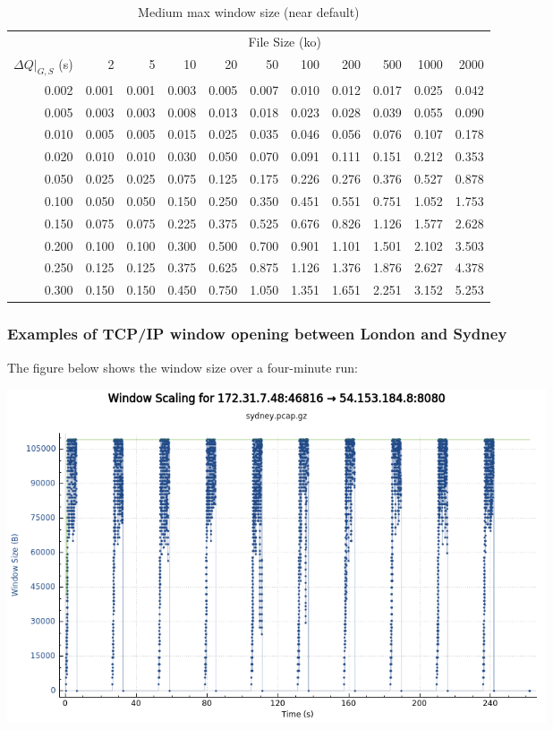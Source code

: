 \documentclass[11pt,a4paper]{article}
\begin{document}
\begin{table}
\begin{longtable}[]{r|rrrrrrrrrr}
\toprule
  \caption{Medium max window size (near default)}
  \label{table:medium-max-window-size}
  \tabularnewline
\midrule
                       & \multicolumn{10}{c}{File Size (ko)}\tabularnewline
$\Delta{}Q|_{G,S}$ (s) & 2 & 5 & 10 & 20 & 50 & 100 & 200 & 500 & 1000 & 2000\tabularnewline
\midrule
\endhead
0.002 & 0.001 & 0.001 & 0.003 & 0.005 & 0.007 & 0.010 & 0.012 & 0.017 &
0.025 & 0.042\tabularnewline
0.005 & 0.003 & 0.003 & 0.008 & 0.013 & 0.018 & 0.023 & 0.028 & 0.039 &
0.055 & 0.090\tabularnewline
0.010 & 0.005 & 0.005 & 0.015 & 0.025 & 0.035 & 0.046 & 0.056 & 0.076 &
0.107 & 0.178\tabularnewline
0.020 & 0.010 & 0.010 & 0.030 & 0.050 & 0.070 & 0.091 & 0.111 & 0.151 &
0.212 & 0.353\tabularnewline
0.050 & 0.025 & 0.025 & 0.075 & 0.125 & 0.175 & 0.226 & 0.276 & 0.376 &
0.527 & 0.878\tabularnewline
0.100 & 0.050 & 0.050 & 0.150 & 0.250 & 0.350 & 0.451 & 0.551 & 0.751 &
1.052 & 1.753\tabularnewline
0.150 & 0.075 & 0.075 & 0.225 & 0.375 & 0.525 & 0.676 & 0.826 & 1.126 &
1.577 & 2.628\tabularnewline
0.200 & 0.100 & 0.100 & 0.300 & 0.500 & 0.700 & 0.901 & 1.101 & 1.501 &
2.102 & 3.503\tabularnewline
0.250 & 0.125 & 0.125 & 0.375 & 0.625 & 0.875 & 1.126 & 1.376 & 1.876 &
2.627 & 4.378\tabularnewline
0.300 & 0.150 & 0.150 & 0.450 & 0.750 & 1.050 & 1.351 & 1.651 & 2.251 &
3.152 & 5.253\tabularnewline
\bottomrule
\end{longtable}
\end{table}

\subsubsection{Examples of TCP/IP window opening between London and Sydney}
\label{examples-of-tcpip-window-opening-between-london-and-sydney}

The figure below shows the window size over a four-minute run:

\includegraphics[width=6.27083in,height=3.88889in]{./media/image1.png}
\end{document}
